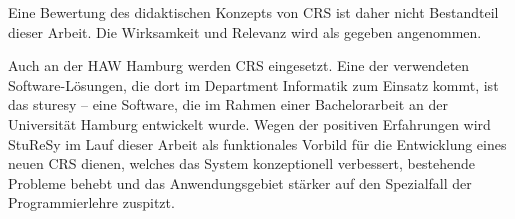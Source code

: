 Eine Bewertung des didaktischen Konzepts von CRS ist daher nicht Bestandteil dieser Arbeit. Die Wirksamkeit und Relevanz wird als gegeben angenommen.

Auch an der HAW Hamburg werden CRS eingesetzt. Eine der verwendeten Software-Lösungen, die dort im Department Informatik zum Einsatz kommt, ist das \ac{sturesy} – eine Software, die im Rahmen einer Bachelorarbeit an der Universität Hamburg entwickelt wurde\cite{sturesy}. Wegen der positiven Erfahrungen wird StuReSy im Lauf dieser Arbeit als funktionales Vorbild für die Entwicklung eines neuen CRS dienen, welches das System konzeptionell verbessert, bestehende Probleme behebt und das Anwendungsgebiet stärker auf den Spezialfall der Programmierlehre zuspitzt.